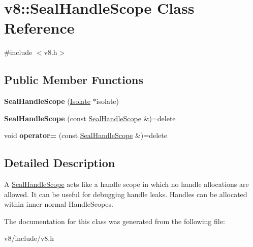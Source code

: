 \hypertarget{classv8_1_1SealHandleScope}{}\section{v8\+:\+:Seal\+Handle\+Scope Class Reference}
\label{classv8_1_1SealHandleScope}


{\ttfamily \#include $<$v8.\+h$>$}

\subsection*{Public Member Functions}
\begin{DoxyCompactItemize}
\item 
\mbox{\label{classv8_1_1SealHandleScope_acfdab75cc53b53d3ba1a50ab5f4fe16e}} 
{\bfseries Seal\+Handle\+Scope} (\mbox{\hyperlink{classv8_1_1Isolate}{Isolate}} $\ast$isolate)
\item 
\mbox{\label{classv8_1_1SealHandleScope_a5e1f6e49a9aa67bb570437fa98097e75}} 
{\bfseries Seal\+Handle\+Scope} (const \mbox{\hyperlink{classv8_1_1SealHandleScope}{Seal\+Handle\+Scope}} \&)=delete
\item 
\mbox{\label{classv8_1_1SealHandleScope_a61b69e50f3996e315c4d3f41c1f67956}} 
void {\bfseries operator=} (const \mbox{\hyperlink{classv8_1_1SealHandleScope}{Seal\+Handle\+Scope}} \&)=delete
\end{DoxyCompactItemize}


\subsection{Detailed Description}
A \mbox{\hyperlink{classv8_1_1SealHandleScope}{Seal\+Handle\+Scope}} acts like a handle scope in which no handle allocations are allowed. It can be useful for debugging handle leaks. Handles can be allocated within inner normal Handle\+Scopes. 

The documentation for this class was generated from the following file\+:\begin{DoxyCompactItemize}
\item 
v8/include/v8.\+h\end{DoxyCompactItemize}
